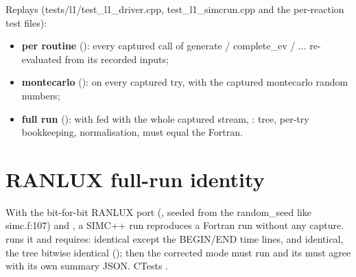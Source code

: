 Replays (tests/\allowbreak{}l1/\allowbreak{}test\_\allowbreak{}l1\_\allowbreak{}driver.\allowbreak{}cpp,\allowbreak{} test\_\allowbreak{}l1\_\allowbreak{}simcrun.\allowbreak{}cpp and the per-reaction test files):

\begin{itemize}
\item \textbf{per routine} (): every captured call of generate / complete\_\allowbreak{}ev / ... re-evaluated
from its recorded inputs;
\item \textbf{montecarlo} ():  on every captured try, with the captured montecarlo
random numbers;
\item \textbf{full run} ():  with  fed with the whole captured stream,
: tree, per-try bookkeeping,\allowbreak{} normalisation,\allowbreak{}  must equal the Fortran.
\end{itemize}
\section{\texorpdfstring{RANLUX full-run identity}{RANLUX full-run identity}}\label{translation_report-02u5fvalidation:24-ranlux-full-run-identity}
With the bit-for-bit RANLUX port (, seeded from the  random\_\allowbreak{}seed like simc.f:107) and
, a SIMC++ run reproduces a Fortran run without any capture.  runs it and requires:  identical except the BEGIN/END time
lines,  and  identical, the  tree bitwise identical (); then the corrected mode
must run and its  must agree with its own summary JSON. CTests .

